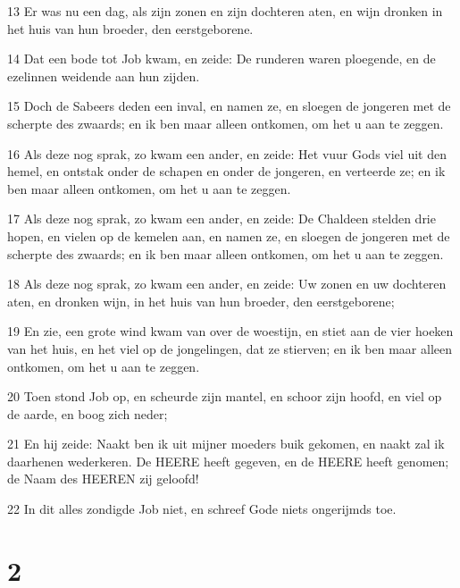 \par 13 Er was nu een dag, als zijn zonen en zijn dochteren aten, en wijn dronken in het huis van hun broeder, den eerstgeborene.
\par 14 Dat een bode tot Job kwam, en zeide: De runderen waren ploegende, en de ezelinnen weidende aan hun zijden.
\par 15 Doch de Sabeers deden een inval, en namen ze, en sloegen de jongeren met de scherpte des zwaards; en ik ben maar alleen ontkomen, om het u aan te zeggen.
\par 16 Als deze nog sprak, zo kwam een ander, en zeide: Het vuur Gods viel uit den hemel, en ontstak onder de schapen en onder de jongeren, en verteerde ze; en ik ben maar alleen ontkomen, om het u aan te zeggen.
\par 17 Als deze nog sprak, zo kwam een ander, en zeide: De Chaldeen stelden drie hopen, en vielen op de kemelen aan, en namen ze, en sloegen de jongeren met de scherpte des zwaards; en ik ben maar alleen ontkomen, om het u aan te zeggen.
\par 18 Als deze nog sprak, zo kwam een ander, en zeide: Uw zonen en uw dochteren aten, en dronken wijn, in het huis van hun broeder, den eerstgeborene;
\par 19 En zie, een grote wind kwam van over de woestijn, en stiet aan de vier hoeken van het huis, en het viel op de jongelingen, dat ze stierven; en ik ben maar alleen ontkomen, om het u aan te zeggen.
\par 20 Toen stond Job op, en scheurde zijn mantel, en schoor zijn hoofd, en viel op de aarde, en boog zich neder;
\par 21 En hij zeide: Naakt ben ik uit mijner moeders buik gekomen, en naakt zal ik daarhenen wederkeren. De HEERE heeft gegeven, en de HEERE heeft genomen; de Naam des HEEREN zij geloofd!
\par 22 In dit alles zondigde Job niet, en schreef Gode niets ongerijmds toe.

\chapter{2}

